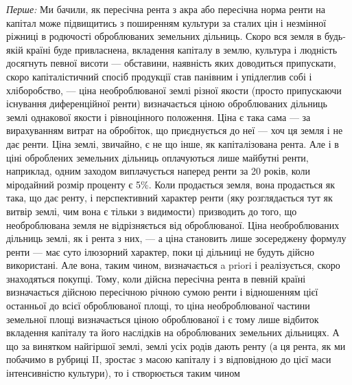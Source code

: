 \emph{Перше:} Ми бачили, як пересічна рента з акра або пересічна норма
ренти на капітал може підвищитись з поширенням культури за сталих цін і
незмінної ріжниці в родючості оброблюваних земельних дільниць. Скоро вся
земля в будь-якій країні буде привласнена, вкладення капіталу в землю, культура
і людність досягнуть певної висоти — обставини, наявність яких доводиться
припускати, скоро капіталістичний спосіб продукції став панівним і упідлеглив
собі і хліборобство, — ціна необроблюваної землі різної якости (просто припускаючи
існування диференційної ренти) визначається ціною оброблюваних дільниць
землі однакової якости і рівноцінного положення. Ціна є така сама — за вирахуванням
витрат на обробіток, що приєднується до неї — хоч ця земля і не
дає ренти. Ціна землі, звичайно, є не що інше, як капіталізована рента. Але
і в ціні оброблених земельних дільниць оплачуються лише майбутні ренти, наприклад,
одним заходом виплачується наперед ренти за 20 років, коли міродайний
розмір проценту є 5\%. Коли продається земля, вона продається як така, що дає
ренту, і перспективний характер ренти (яку розглядається тут як витвір землі, чим
вона є тільки з видимости) призводить до того, що необроблювана земля не
відрізняється від оброблюваної. Ціна необроблюваних дільниць землі, як і рента
з них, — а ціна становить лише зосереджену формулу ренти — має суто ілюзорний
характер, поки ці дільниці не будуть дійсно використані. Але вона, таким
чином, визначається a priori і реалізується, скоро знаходяться покупці. Тому,
коли дійсна пересічна рента в певній країні визначається дійсною пересічною
річною сумою ренти і відношенням цієї останньої до всієї оброблюваної площі,
то ціна необроблюваної частини земельної площі визначається ціною оброблюваної
і є тому лише відбиток вкладення капіталу та його наслідків на оброблюваних
земельних дільницях. А що за винятком найгіршої землі, землі усіх родів
дають ренту (а ця рента, як ми побачимо в рубриці II, зростає з масою капіталу
і з відповідною до цієї маси інтенсивністю культури), то і створюється таким чином
\parbreak{}  %

